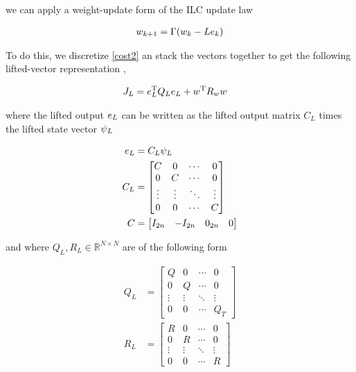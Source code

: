we can apply a weight-update form of the ILC update law \cite{Bristow06}

\begin{equation}
\begin{aligned}
w_{k+1} = \Gamma(w_{k} - Le_{k})
\end{aligned}
\label{ILCupdateFormWeights}
\end{equation}

To do this, we discretize \eqref{cost2} an stack the vectors together to get the following lifted-vector representation \cite{Bristow06}, \cite{Schoellig12}

\begin{equation}
\begin{aligned}
J_L &= e_L^{\mathrm{T}}Q_Le_L + w^{\mathrm{T}}R_ww
\end{aligned}
\label{costFunctionalWeights}
\end{equation}

where the lifted output $e_L$ can be written as the lifted output matrix $C_L$ times the lifted state vector $\psi_L$

\begin{equation}
\begin{aligned}
e_L &= C_L \psi_L \\
C_L &= 
  \begin{bmatrix}
   C & 0 & \cdots & 0 \\
   0 & C & \cdots & 0 \\
   \vdots  & \vdots  & \ddots & \vdots  \\
   0 & 0 & \cdots & C
  \end{bmatrix} \\
C &= \begin{bmatrix}
  I_{2n} & -I_{2n} & 0_{2n} & 0
 \end{bmatrix}
\end{aligned}
\label{outputWeights}
\end{equation}

\noindent and where $Q_L, R_L \in \mathbb{R}^{N \times N}$ are of the following form

\begin{equation*}
\begin{aligned}
 Q_L &= 
 \begin{bmatrix}
  Q & 0 & \cdots & 0 \\
  0 & Q & \cdots & 0 \\
  \vdots  & \vdots  & \ddots & \vdots  \\
  0 & 0 & \cdots & Q_T
 \end{bmatrix} \\
 R_L &= 
  \begin{bmatrix}
   R & 0 & \cdots & 0 \\
   0 & R & \cdots & 0 \\
   \vdots  & \vdots  & \ddots & \vdots  \\
   0 & 0 & \cdots & R
  \end{bmatrix}
\end{aligned}
\end{equation*}

